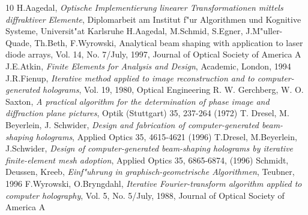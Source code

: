 \documentclass[11pt,a4paper]{article}
\begin{document}
\newpage
\begin{thebibliography}{10}
    H.Aagedal, {\em Optische Implementierung linearer Transformationen mittels diffraktiver 
    Elemente}, Diplomarbeit am Institut f"ur Algorithmen und Kognitive Systeme, Universit"at Karlsruhe
    H.Aagedal, M.Schmid, S.Egner, J.M"uller-Quade, Th.Beth, F.Wyrowski, {Analytical beam shaping 
    with application to laser diode arrays}, Vol. 14, No. 7/July, 1997, Journal of Optical Society of America A
    J.E.Atkin, {\em Finite Elements for Analysis and Design}, Academic, London, 1994
    J.R.Fienup, {\em Iterative method applied to image reconstruction and to computer-generated
    holograms}, Vol. 19, 1980, Optical Engineering 
    R. W. Gerchberg, W. O. Saxton, {\em A practical algorithm for the determination of phase image and diffraction
    plane pictures}, Optik (Stuttgart) 35, 237-264 (1972)
    T. Dresel, M. Beyerlein, J. Schwider, {\em Design and fabrication of computer-generated beam-shaping holograms},
    Applied Optics 35, 4615-4621 (1996)
    T.Dresel, M.Beyerlein, J.Schwider, {\em Design of computer-generated beam-shaping holograms by iterative
    finite-element mesh adoption}, Applied Optics 35, 6865-6874, (1996)
    Schmidt, Deussen, Kreeb, {\em Einf"uhrung in graphisch-geometrische Algorithmen}, Teubner, 1996
    F.Wyrowski, O.Bryngdahl, {\em Iterative Fourier-transform  algorithm applied to computer holography},
    Vol. 5, No. 5/July, 1988, Journal of Optical Society of America A
\end{thebibliography}
\end{document}
